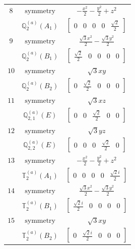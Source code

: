 \documentclass[fleqn,8pt,landscape]{jsarticle}
\begin{document}
\begin{longtable}{ccc}
$ 8 $ & $ \text{symmetry} $ & $ - \frac{x^{2}}{2} - \frac{y^{2}}{2} + z^{2} $ \\
$  $ & $ \mathbb{Q}_{2}^{(a)}(A_{1}) $ & $ \begin{bmatrix} 0 & 0 & 0 & 0 & \frac{\sqrt{2}}{2} \end{bmatrix} $ \\ \hline
$ 9 $ & $ \text{symmetry} $ & $ \frac{\sqrt{3} x^{2}}{2} - \frac{\sqrt{3} y^{2}}{2} $ \\
$  $ & $ \mathbb{Q}_{2}^{(a)}(B_{1}) $ & $ \begin{bmatrix} \frac{\sqrt{2}}{2} & 0 & 0 & 0 & 0 \end{bmatrix} $ \\ \hline
$ 10 $ & $ \text{symmetry} $ & $ \sqrt{3} x y $ \\
$  $ & $ \mathbb{Q}_{2}^{(a)}(B_{2}) $ & $ \begin{bmatrix} 0 & \frac{\sqrt{2}}{2} & 0 & 0 & 0 \end{bmatrix} $ \\ \hline
$ 11 $ & $ \text{symmetry} $ & $ \sqrt{3} x z $ \\
$  $ & $ \mathbb{Q}_{2,1}^{(a)}(E) $ & $ \begin{bmatrix} 0 & 0 & \frac{\sqrt{2}}{2} & 0 & 0 \end{bmatrix} $ \\ \hline
$ 12 $ & $ \text{symmetry} $ & $ \sqrt{3} y z $ \\
$  $ & $ \mathbb{Q}_{2,2}^{(a)}(E) $ & $ \begin{bmatrix} 0 & 0 & 0 & \frac{\sqrt{2}}{2} & 0 \end{bmatrix} $ \\ \hline
$ 13 $ & $ \text{symmetry} $ & $ - \frac{x^{2}}{2} - \frac{y^{2}}{2} + z^{2} $ \\
$  $ & $ \mathbb{T}_{2}^{(a)}(A_{1}) $ & $ \begin{bmatrix} 0 & 0 & 0 & 0 & \frac{\sqrt{2} i}{2} \end{bmatrix} $ \\ \hline
$ 14 $ & $ \text{symmetry} $ & $ \frac{\sqrt{3} x^{2}}{2} - \frac{\sqrt{3} y^{2}}{2} $ \\
$  $ & $ \mathbb{T}_{2}^{(a)}(B_{1}) $ & $ \begin{bmatrix} \frac{\sqrt{2} i}{2} & 0 & 0 & 0 & 0 \end{bmatrix} $ \\ \hline
$ 15 $ & $ \text{symmetry} $ & $ \sqrt{3} x y $ \\
$  $ & $ \mathbb{T}_{2}^{(a)}(B_{2}) $ & $ \begin{bmatrix} 0 & \frac{\sqrt{2} i}{2} & 0 & 0 & 0 \end{bmatrix} $ \\ \hline

\end{longtable}
\end{document}
